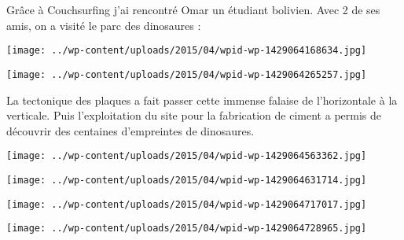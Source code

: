  Grâce à Couchsurfing j'ai rencontré Omar un étudiant bolivien. Avec 2 de ses amis, on a visité le parc des dinosaures :
\begin{center} \texttt{[image: ../wp-content/uploads/2015/04/wpid-wp-1429064168634.jpg]} \end{center}
\begin{center} \texttt{[image: ../wp-content/uploads/2015/04/wpid-wp-1429064265257.jpg]} \end{center}

 La tectonique des plaques a fait passer cette immense falaise de l'horizontale à la verticale. Puis l'exploitation du site pour la fabrication de ciment a permis de découvrir des centaines d'empreintes de dinosaures. 
\begin{center} \texttt{[image: ../wp-content/uploads/2015/04/wpid-wp-1429064563362.jpg]} \end{center}
\begin{center} \texttt{[image: ../wp-content/uploads/2015/04/wpid-wp-1429064631714.jpg]} \end{center}
\begin{center} \texttt{[image: ../wp-content/uploads/2015/04/wpid-wp-1429064717017.jpg]} \end{center}
\begin{center} \texttt{[image: ../wp-content/uploads/2015/04/wpid-wp-1429064728965.jpg]} \end{center}